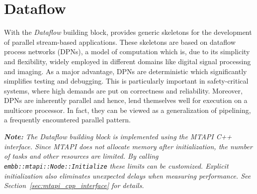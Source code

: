 \chapter{Dataflow}
\label{cha:dataflow}

With the \emph{Dataflow} building block, \embb provides generic skeletons for the development of parallel stream-based applications. These skeletons are based on dataflow process networks (DPNs), a model of computation which is, due to its simplicity and flexibility, widely employed in different domains like digital signal processing and imaging. As a major advantage, DPNs are deterministic which significantly simplifies testing and debugging. This is particularly important in safety-critical systems, where high demands are put on correctness and reliability. Moreover, DPNs are inherently parallel and hence, lend themselves well for execution on a multicore processor. In fact, they can be viewed as a generalization of pipelining, a frequently encountered parallel pattern.


\emph{\textbf{Note:} The \emph{Dataflow} building block is implemented using the MTAPI C++ interface. Since MTAPI does not allocate memory after initialization, the number of tasks and other resources are limited. By calling \lstinline|embb::mtapi::Node::Initialize| these limits can be customized. Explicit initialization also eliminates unexpected delays when measuring performance. See Section~\ref{sec:mtapi_cpp_interface} for details.}

